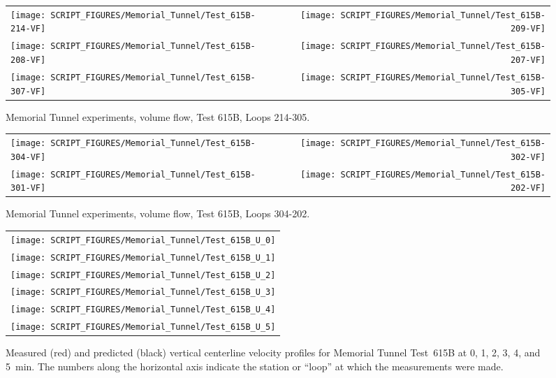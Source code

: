 \begin{figure}[p]
\begin{tabular*}{\textwidth}{l@{\extracolsep{\fill}}r}
\texttt{[image: SCRIPT\_FIGURES/Memorial\_Tunnel/Test\_615B-214-VF]} &
\texttt{[image: SCRIPT\_FIGURES/Memorial\_Tunnel/Test\_615B-209-VF]} \\
\texttt{[image: SCRIPT\_FIGURES/Memorial\_Tunnel/Test\_615B-208-VF]} &
\texttt{[image: SCRIPT\_FIGURES/Memorial\_Tunnel/Test\_615B-207-VF]} \\
\texttt{[image: SCRIPT\_FIGURES/Memorial\_Tunnel/Test\_615B-307-VF]} &
\texttt{[image: SCRIPT\_FIGURES/Memorial\_Tunnel/Test\_615B-305-VF]}
\end{tabular*}
\caption[Memorial Tunnel experiments, volume flow, Test 615B, Loops 214-305]{Memorial Tunnel experiments, volume flow, Test 615B, Loops 214-305.}
\label{Memorial_Tunnel_615B_214-305}
\end{figure}

\begin{figure}[p]
\begin{tabular*}{\textwidth}{l@{\extracolsep{\fill}}r}
\texttt{[image: SCRIPT\_FIGURES/Memorial\_Tunnel/Test\_615B-304-VF]} &
\texttt{[image: SCRIPT\_FIGURES/Memorial\_Tunnel/Test\_615B-302-VF]} \\
\texttt{[image: SCRIPT\_FIGURES/Memorial\_Tunnel/Test\_615B-301-VF]} &
\texttt{[image: SCRIPT\_FIGURES/Memorial\_Tunnel/Test\_615B-202-VF]}
\end{tabular*}
\caption[Memorial Tunnel experiments, volume flow, Test 615B, Loops 304-202]{Memorial Tunnel experiments, volume flow, Test 615B, Loops 304-202.}
\label{Memorial_Tunnel_615B_304-202}
\end{figure}

\begin{figure}[p]
\begin{tabular*}{\textwidth}{c}
\texttt{[image: SCRIPT\_FIGURES/Memorial\_Tunnel/Test\_615B\_U\_0]} \\
\texttt{[image: SCRIPT\_FIGURES/Memorial\_Tunnel/Test\_615B\_U\_1]} \\
\texttt{[image: SCRIPT\_FIGURES/Memorial\_Tunnel/Test\_615B\_U\_2]} \\
\texttt{[image: SCRIPT\_FIGURES/Memorial\_Tunnel/Test\_615B\_U\_3]} \\
\texttt{[image: SCRIPT\_FIGURES/Memorial\_Tunnel/Test\_615B\_U\_4]} \\
\texttt{[image: SCRIPT\_FIGURES/Memorial\_Tunnel/Test\_615B\_U\_5]}
\end{tabular*}
\caption[Memorial Tunnel experiments, velocity profiles, Test 615B, 0-5 min]{Measured (red) and predicted (black) vertical centerline velocity profiles for Memorial Tunnel Test~615B at 0, 1, 2, 3, 4, and 5~min. The numbers along the horizontal axis indicate the station or ``loop'' at which the measurements were made.}
\label{Memorial_615B_U_0-5}
\end{figure}

